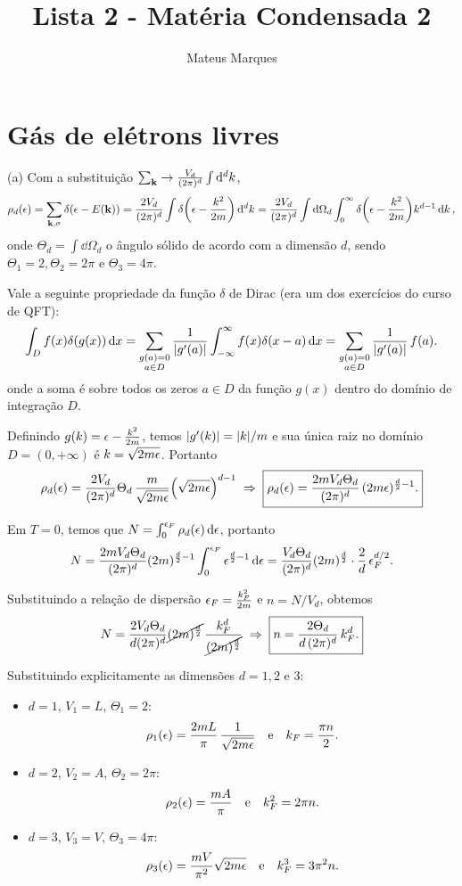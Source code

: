 \documentclass[a4paper,10pt]{article}
\title{\Huge{\textbf{Lista 2 - Matéria Condensada 2}}}
\author{Mateus Marques}
\begin{document}
\maketitle


\section{Gás de elétrons livres}


(a) Com a substituição $\sum_{\k} \to \frac{V_d}{(2\pi)^d} \int \dd[d]{k}$,
$$
\rho_d(\eps) = \sum_{\k, \s} \delta(\eps - E(\k)) =
\frac{2V_d}{(2\pi)^d} \int \delta\qty(\eps - \frac{k^2}{2m}) \dd[d]{k} =
\frac{2V_d}{(2\pi)^d} \int \dd{\Omega_d} \int_0^\infty \delta\qty(\eps - \frac{k^2}{2m}) k^{d-1} \dd{k},
$$
onde $\Theta_d = \int \dd{\Omega_d}$ o ângulo sólido de acordo com a dimensão $d$, sendo $\Theta_1 = 2, \Theta_2 = 2\pi$ e $\Theta_3 = 4\pi$.

Vale a seguinte propriedade da função $\delta$ de Dirac (era um dos exercícios do curso de QFT):
$$
\int_{D} f(x) \delta(g(x)) \dd{x} =
\sum_{\substack{g(a)=0 \\ a \in D}} \frac{1}{\abs{g'(a)}} \int_{-\infty}^{\infty} f(x) \delta(x-a) \dd{x}=
\sum_{\substack{g(a)=0 \\ a \in D}} \frac{1}{\abs{g'(a)}} \, f(a).
$$
onde a soma é sobre todos os zeros $a \in D$ da função $g(x)$ dentro do domínio de integração $D$.

Definindo $g(k) = \eps - \frac{k^2}{2m}$, temos $\abs{g'(k)} = \abs{k} / m$ e sua única raiz no domínio $D = (0, +\infty)$ é $k = \sqrt{2m \eps}$. Portanto
$$
\rho_d(\eps) = \frac{2V_d}{(2\pi)^d} \Theta_d \, \frac{m}{\sqrt{2m\eps}}
\qty(\sqrt{2m \eps})^{d-1} \implies
\boxed{ \rho_d(\eps) = \frac{2 m V_d \Theta_d}{(2\pi)^d} \, (2m\eps)^{\frac{d}{2}-1}. }
$$

Em $T = 0$, temos que $N = \int_0^{\eps_F} \rho_d(\eps) \dd{\eps}$, portanto
$$
N = \frac{2m V_d \Theta_d}{(2\pi)^d} (2m)^{\frac{d}{2} - 1} \int_0^{\eps_F} \eps^{\frac{d}{2} - 1} \dd{\eps} =
\frac{V_d \Theta_d }{(2\pi)^d} (2m)^{\frac{d}{2}} \cdot \frac{2}{d} \, \eps_F^{d/2}.
$$

Substituindo a relação de dispersão $\eps_F = \frac{k_F^2}{2m}$ e $n = N/V_d$, obtemos
$$
N =
\frac{2 V_d \Theta_d }{d (2\pi)^d} \cancel{(2m)^{\frac{d}{2}}} \, \frac{k_F^d}{\cancel{(2m)^{\frac{d}{2}}}} \implies
\boxed{ n = \frac{2 \Theta_d}{d \, (2\pi)^d} \, k_F^d. }
$$

Substituindo explicitamente as dimensões $d = 1, 2$ e $3$:
\begin{itemize}
\item $d = 1$, $V_1 = L$, $\Theta_1 = 2$:
$$
\rho_1(\eps) = \frac{2 m L}{\pi} \, \frac{1}{\sqrt{2m\eps}} \e
k_F = \frac{\pi n}{2}.
$$
\item $d = 2$, $V_2 = A$, $\Theta_2 = 2\pi$:
$$
\rho_2(\eps) = \frac{m A}{\pi} \e
k_F^2 = 2 \pi n.
$$
\item $d = 3$, $V_3 = V$, $\Theta_3 = 4\pi$:
$$
\rho_3(\eps) = \frac{m V}{\pi^2} \sqrt{2m\eps} \e
k_F^3 = 3\pi^2 n.
$$
\end{itemize}
\end{document}
